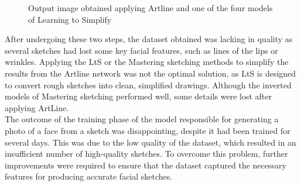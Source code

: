 \begin{figure}[htbp]
    \caption{Output image obtained applying Artline and one of the four models of Learning to Simplify}
    \label{fig:simplifyModelsRes}
\end{figure}

\noindent After undergoing these two steps, the dataset obtained was lacking in quality as several sketches had lost some key facial features, such as lines of the lips or wrinkles. Applying the LtS or the Mastering sketching methods to simplify the results from the Artline network was not the optimal solution, as LtS is designed to convert rough sketches into clean, simplified drawings. Although the inverted models of Mastering sketching performed well, some details were lost after applying ArtLine.\\
The outcome of the training phase of the model responsible for generating a photo of a face from a sketch was disappointing, despite it had been trained for several days. This was due to the low quality of the dataset, which resulted in an insufficient number of high-quality sketches. To overcome this problem, further improvements were required to ensure that the dataset captured the necessary features for producing accurate facial sketches.

